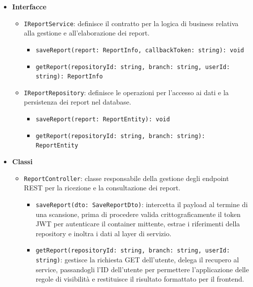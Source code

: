 \documentclass[a4paper, 11pt]{article}
\begin{document}
\begin{itemize}
  \item \textbf{Interfacce}
    \begin{itemize}
      \item \texttt{IReportService}: definisce il contratto per la logica di business relativa alla gestione e all'elaborazione dei report.
        \begin{itemize}
          \item \texttt{saveReport(report: ReportInfo, callbackToken: string): void} 
          
          \item \texttt{getReport(repositoryId: string, branch: string, userId: string): ReportInfo} 
        \end{itemize}

      \item \texttt{IReportRepository}: definisce le operazioni per l'accesso ai dati e la persistenza dei report nel database.
        \begin{itemize}
          \item \texttt{saveReport(report: ReportEntity): void} 
          
          \item \texttt{getReport(repositoryId: string, branch: string): ReportEntity} 
        \end{itemize}
    \end{itemize}

  \item \textbf{Classi}
    \begin{itemize}
      \item \texttt{ReportController}: classe responsabile della gestione degli endpoint REST per la ricezione e la consultazione dei report.
        \begin{itemize}
          \item \texttt{saveReport(dto: SaveReportDto)}: intercetta il payload al termine di una scansione, prima di procedere valida crittograficamente il token JWT per autenticare il container mittente, estrae i riferimenti della repository e inoltra i dati al layer di servizio.
          
          \item \texttt{getReport(repositoryId: string, branch: string, userId: string)}: gestisce la richiesta GET dell'utente, delega il recupero al service, passandogli l'ID dell'utente per permettere l'applicazione delle regole di visibilità e restituisce il risultato formattato per il frontend.
        \end{itemize}


\end{itemize}
\end{itemize}
\end{document}
